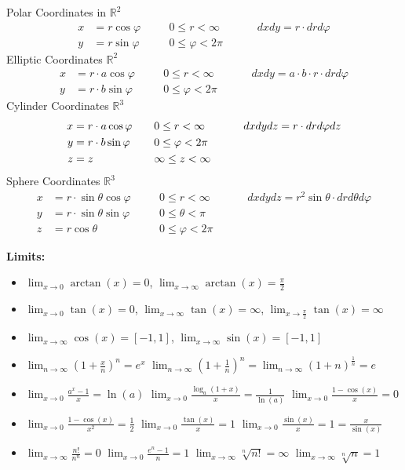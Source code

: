 \documentclass[]{article}
\newcommand{\R}{\mathbb R}
\begin{document}
\begin{multicols*}{3}
Polar Coordinates in $\R^2$
\begin{alignat*}{4}
  x &= r \cos \varphi \quad &&0 \leq r < \infty \quad &&&dxdy = r \cdot drd\varphi\\
  y &= r \sin \varphi \quad &&0 \leq \varphi < 2\pi &&&
\end{alignat*}
Elliptic Coordinates $\R^2$
\begin{alignat*}{4}
  x &= r \cdot  a \cos \varphi\quad &&0 \leq r < \infty\quad &&&dxdy = a \cdot b \cdot  r \cdot drd\varphi\\
  y &= r \cdot b \sin \varphi\quad &&0 \leq \varphi < 2\pi &&&
\end{alignat*}
Cylinder Coordinates $\R^3$ \begin{alignat*}{4}
  x &= r \cdot  a \cos \varphi\quad &&0 \leq r < \infty &&&dxdydz = r \cdot drd\varphi dz\\
  y &= r \cdot b \sin \varphi\quad &&0 \leq \varphi < 2\pi\\
  z &= z\quad &&\-\infty \leq z < \infty\quad
\end{alignat*}
Sphere Coordinates $\R^3$ \begin{alignat*}{4}
  x &= r \cdot \sin \theta \cos \varphi \quad &&0 \leq r < \infty \quad &&&dxdydz = r^2 \sin \theta \cdot drd\theta d\varphi\\
  y &= r \cdot \sin \theta \sin \varphi \quad && 0 \leq \theta < \pi &&&\\
  z &= r \cos \theta \quad &&0 \leq \varphi < 2\pi &&&
\end{alignat*}

\textbf{Limits:}

\begin{itemize}
  \item $\lim_{x\to 0} \arctan(x) = 0$, $\lim_{x\to\infty} \arctan(x) = \frac{\pi}{2}$
  \item $\lim_{x\to 0} \tan(x) = 0$, $\lim_{x\to\infty} \tan(x) = \infty$, $\lim_{x\to\frac{\pi}{2}} \tan(x) = \infty$
  \item $\lim_{x\to\infty}{\cos(x)=[-1, 1]}$, $\lim_{x\to\infty}{\sin(x)=[-1, 1]}$
  \item $\lim_{n \to \infty}{(1+\frac{x}{n})^{n}} = e^{x}$  $\lim_{n \to \infty}{(1+\frac{1}{n})^{n}} = \lim_{n\to\infty}{(1+n)^{\frac{1}{n}}} = e$ 
  \item $\lim_{x\to 0}{\frac{a^{x}-1}{x}} = \ln(a)$  $\lim_{x\to 0}\frac{\log_a(1+x)}{x} = \frac{1}{\ln(a)}$  $\lim_{x \to 0}{\frac{1-\cos(x)}{x}} = 0$ 
  \item $ \lim_{x\to 0}{\frac{1-\cos(x)}{x^{2}}} = \frac{1}{2} $  $ \lim_{x\to 0}{\frac{\tan(x)}{x}} = 1$  $ \lim_{x\to 0}{\frac{\sin(x)}{x}} = 1 = \frac{x}{\sin(x)}$ 
  \item $\lim_{x\to\infty}{\frac{n!}{n^{n}}} = 0$  $\lim_{x\to 0}{\frac{e^{n} -1}{n}} = 1$  $\lim_{x\to\infty}{\sqrt[n]{n!}} = \infty$  $\lim_{x\to\infty} {\sqrt[n]{n}} = 1$
\end{itemize}


\end{multicols*}
\end{document}
